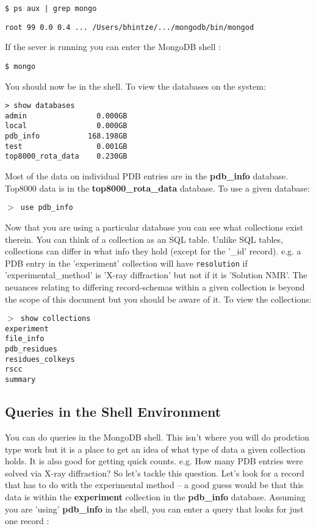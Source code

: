 \documentclass[12pt]{article}
\newcommand{\cmdline}[1]{\vspace{5mm} \noindent
\texttt{\$ #1}
\vspace{5mm}

}
\newcommand{\mdbcmdline}[1]{\vspace{5mm} \noindent
\texttt{$>$ #1}
\vspace{5mm}

}
\newcommand{\mdbdb}[1]{{\color{BlueViolet}\textbf{#1}}}
\newcommand{\mdbcol}[1]{{\color{Bittersweet}\textbf{#1}}}
\begin{document}
\cmdline{ps aux | grep mongo}
\noindent
\texttt{root 99 0.0 0.4 ... /Users/bhintze/.../mongodb/bin/mongod}

\vspace{5mm}
\noindent
If the sever is running you can enter the MongoDB shell :

\cmdline{mongo}
\noindent
You should now be in the shell.
To view the databases on the system:

\begin{verbatim}
> show databases
admin                0.000GB
local                0.000GB
pdb_info           168.198GB
test                 0.001GB
top8000_rota_data    0.230GB
\end{verbatim}

\noindent
Most of the data on individual PDB entries are in the \mdbdb{pdb\_info} database.
Top8000 data is in the \mdbdb{top8000\_rota\_data} database.
\noindent
To use a given database:

\mdbcmdline{use pdb\_info}
\noindent
Now that you are using a particular database you can see what collections exist therein. 
You can think of a collection as an SQL table.
Unlike SQL tables, collections can differ in what info they hold (except for the '\_id' record).
e.g. a PDB entry in the 'experiment' collection will have \texttt{resolution} if 'experimental\_method' is 'X-ray diffraction' but not if it is 'Solution NMR'.
The neuances relating to differing record-schemas within a given collection is beyond the scope of this document but you should be aware of it. To view the collections:

\mdbcmdline{show collections\\
experiment\\
file\_info\\
pdb\_residues\\
residues\_colkeys\\
rscc\\
summary}

\subsection{Queries in the Shell Environment}
You can do queries in the MongoDB shell. 
This isn't where you will do prodction type work but it is a place to get an idea of what type of data a given collection holds.
It is also good for getting quick counts.
e.g. How many PDB entries were solved via X-ray diffraction?
So let's tackle this question.
Let's look for a record that has to do with the experimental method -- a good guess would be that this data is within the \mdbcol{experiment} collection in the \mdbdb{pdb\_info} database.
Assuming you are 'using' \mdbdb{pdb\_info} in the shell, you can enter a query that looks for just one record :
\end{document}
